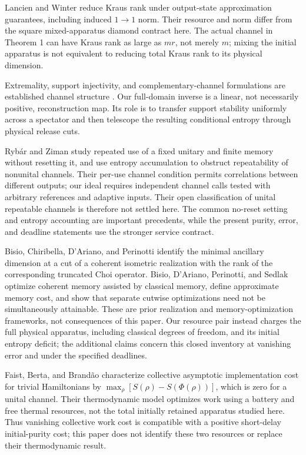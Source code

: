 \documentclass[11pt,a4paper]{article}
\numberwithin{equation}{section}
\begin{document}
Lancien and Winter \citep{lancien2024} reduce Kraus rank under
output-state approximation guarantees, including induced \(1\!\to\!1\)
norm. Their resource and norm differ from the square mixed-apparatus
diamond contract here. The actual channel in Theorem 1 can have Kraus
rank as large as \(mr\), not merely \(m\); mixing the initial apparatus
is not equivalent to reducing total Kraus rank to its physical
dimension.

Extremality, support injectivity, and complementary-channel formulations
are established channel structure \citep{choi1975, holevo2013}. Our
full-domain inverse is a linear, not necessarily positive,
reconstruction map. Its role is to transfer support stability uniformly
across a spectator and then telescope the resulting conditional entropy
through physical release cuts.

Rybár and Ziman \citep{rybar2008} study repeated use of a fixed unitary
and finite memory without resetting it, and use entropy accumulation to
obstruct repeatability of nonunital channels. Their per-use channel
condition permits correlations between different outputs; our ideal
requires independent channel calls tested with arbitrary references and
adaptive inputs. Their open classification of unital repeatable channels
is therefore not settled here. The common no-reset setting and entropy
accounting are important precedents, while the present purity, error,
and deadline statements use the stronger service contract.

Bisio, Chiribella, D'Ariano, and Perinotti \citep[Theorem 2]{bisio2011}
identify the minimal ancillary dimension at a cut of a coherent
isometric realization with the rank of the corresponding truncated Choi
operator. Bisio, D'Ariano, Perinotti, and Sedlak \citep{bisio2012}
optimize coherent memory assisted by classical memory, define
approximate memory cost, and show that separate cutwise optimizations
need not be simultaneously attainable. These are prior realization and
memory-optimization frameworks, not consequences of this paper. Our
resource pair instead charges the full physical apparatus, including
classical degrees of freedom, and its initial entropy deficit; the
additional claims concern this closed inventory at vanishing error and
under the specified deadlines.

Faist, Berta, and Brandão \citep[Theorem 5.1]{faist2021} characterize
collective asymptotic implementation cost for trivial Hamiltonians by
\(\max_\rho[S(\rho)-S(\Phi(\rho))]\), which is zero for a unital
channel. Their thermodynamic model optimizes work using a battery and
free thermal resources, not the total initially retained apparatus
studied here. Thus vanishing collective work cost is compatible with a
positive short-delay initial-purity cost; this paper does not identify
these two resources or replace their thermodynamic result.
\end{document}
